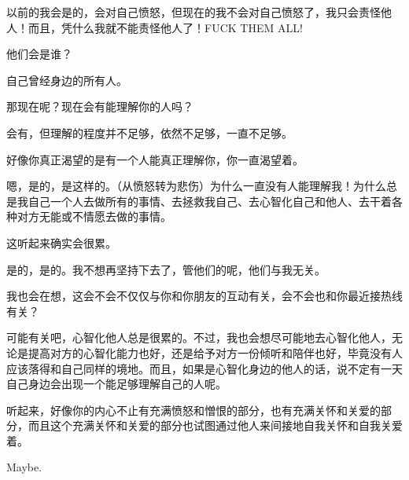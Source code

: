 \begin{compactitem}
	\item 以前的我会是的，会对自己愤怒，但现在的我不会对自己愤怒了，我只会责怪他人！而且，凭什么我就不能责怪他人了！FUCK THEM ALL!
	\item 他们会是谁？
	\item 自己曾经身边的所有人。
	\item 那现在呢？现在会有能理解你的人吗？
	\item 会有，但理解的程度并不足够，依然不足够，一直不足够。
	\item 好像你真正渴望的是有一个人能真正理解你，你一直渴望着。
	\item 嗯，是的，是这样的。（从愤怒转为悲伤）为什么一直没有人能理解我！为什么总是我自己一个人去做所有的事情、去拯救我自己、去心智化自己和他人、去干着各种对方无能或不情愿去做的事情。
	\item 这听起来确实会很累。
	\item 是的，是的。我不想再坚持下去了，管他们的呢，他们与我无关。
	\item 我也会在想，这会不会不仅仅与你和你朋友的互动有关，会不会也和你最近接热线有关？
	\item 可能有关吧，心智化他人总是很累的。不过，我也会想尽可能地去心智化他人，无论是提高对方的心智化能力也好，还是给予对方一份倾听和陪伴也好，毕竟没有人应该落得和自己同样的境地。而且，如果是心智化身边的他人的话，说不定有一天自己身边会出现一个能足够理解自己的人呢。
	\item 听起来，好像你的内心不止有充满愤怒和憎恨的部分，也有充满关怀和关爱的部分，而且这个充满关怀和关爱的部分也试图通过他人来间接地自我关怀和自我关爱着。
	\item Maybe.
\end{compactitem}




